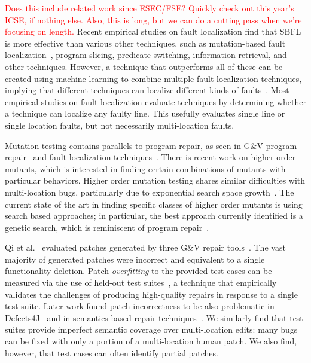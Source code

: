 \documentclass[10pt, conference]{IEEEtran}
\newcommand\todo[1]{\textcolor{red}{#1}}
\begin{document}
\todo{Does this include related work since ESEC/FSE?  Quickly check out this
  year's ICSE, if nothing else.}
\todo{Also, this is long, but we can do a cutting pass when we're focusing on length.}
Recent empirical studies on fault localization find that 
SBFL is more effective than various other techniques, such as 
mutation-based fault localization~\cite{pearson2017evaluating, mut-analysis}, program 
slicing, predicate switching,  information retrieval, and other techniques. 
However, a 
technique that outperforms all of these can be created using machine learning to combine 
multiple fault localization techniques, implying that different techniques can 
localize different kinds of faults~\cite{zou2019empirical}. Most empirical 
studies on fault localization evaluate techniques by determining whether a 
technique can localize any faulty line. This usefully evaluates single line or single 
location faults, but not necessarily multi-location faults.

Mutation testing contains parallels to program repair, as seen in G\&V
program repair~\cite{weimer2013leveraging} and fault 
localization techniques~\cite{metallaxis,muse,mbfl-survey}. 
There is recent work on higher order mutants, which is interested in finding 
certain combinations of mutants with particular behaviors. Higher order mutation testing 
shares similar difficulties with multi-location bugs, particularly due to 
exponential search space growth~\cite{long-search-spaces}. 
The current state of the art in finding specific classes of 
higher order mutants is using search based approaches; in particular, the best approach 
currently identified is a genetic search, which is reminiscent of program repair~\cite{homs, 
genprog}.

Qi et al.~\cite{patch-correctness} evaluated patches generated 
by three G\&V repair tools~\cite{genprog, ae, rsrepair}. 
The vast majority of generated patches were incorrect and equivalent to 
a single functionality deletion.  Patch \emph{overfitting} to the provided test
cases can be measured via the use of held-out test
suites~\cite{Smith15fse}, a technique that empirically validates the challenges of producing
high-quality repairs in response to a single test suite.   Later work found patch incorrectness to be 
also problematic in Defects4J~\cite{d4j-eval} and in semantics-based 
repair techniques~\cite{Le2018}.  We similarly find that test suites provide
imperfect semantic coverage over multi-location edits: many bugs can be fixed
with only a portion of a multi-location human patch.  We 
also find, however, that test cases can often identify partial patches. 
\end{document}
